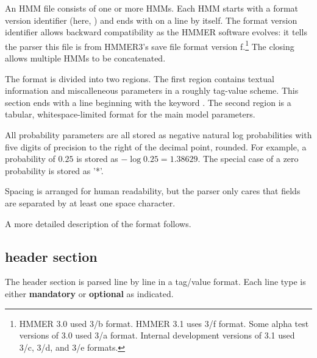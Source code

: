 An HMM file consists of one or more HMMs.  Each HMM starts with a
format version identifier (here, ) and ends with
\mono{//} on a line by itself.  The format version identifier allows
backward compatibility as the HMMER software evolves: it tells the
parser this file is from HMMER3's save file format version
f.\footnote{HMMER 3.0 used 3/b format. HMMER 3.1 uses 3/f format.
  Some alpha test versions of 3.0 used 3/a format. Internal
  development versions of 3.1 used 3/c, 3/d, and 3/e formats.}  The closing
\mono{//} allows multiple HMMs to be concatenated.

The format is divided into two regions. The first region contains
textual information and miscalleneous parameters in a roughly
tag-value scheme.  This section ends with a line beginning with the
keyword . The second region is a tabular, whitespace-limited
format for the main model parameters.

All probability parameters are all stored as negative natural log
probabilities with five digits of precision to the right of the
decimal point, rounded. For example, a probability of $0.25$ is stored
as $-\log 0.25 = 1.38629$. The special case of a zero probability is
stored as '*'.

Spacing is arranged for human readability, but the parser only cares
that fields are separated by at least one space character.

A more detailed description of the format follows.

\subsection{header section}

The header section is parsed line by line in a tag/value format. Each
line type is either \textbf{mandatory} or \textbf{optional} as
indicated. 

